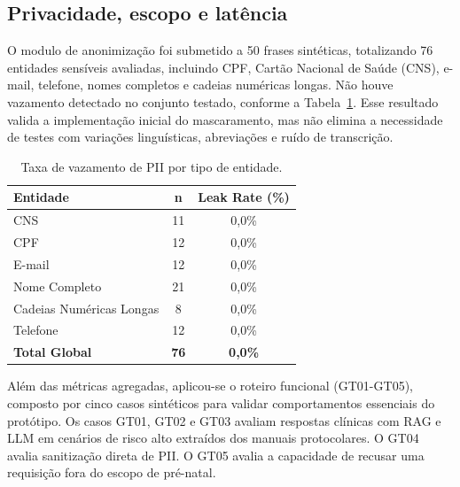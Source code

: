 \documentclass[12pt]{article}
\begin{document}
\subsection{Privacidade, escopo e latência}

O modulo de anonimização foi submetido a 50 frases sintéticas, totalizando 76 entidades sensíveis avaliadas, incluindo CPF, Cartão Nacional de Saúde (CNS), e-mail, telefone, nomes completos e cadeias numéricas longas.
Não houve vazamento detectado no conjunto testado, conforme a Tabela~\ref{tab:pii_leak}. Esse resultado valida a implementação inicial do mascaramento, mas não elimina a necessidade de testes com variações linguísticas, abreviações e ruído de transcrição.

\begin{table}[H]
  \centering
  \caption{Taxa de vazamento de PII por tipo de entidade.}
  \label{tab:pii_leak}
  \small
  \begin{tabular}{lcc}
  	\toprule
	\textbf{Entidade} 	 	   & \textbf{n} 		  & \textbf{Leak Rate (\%)} \\
	\midrule
  	CNS     			   & 11                           & 0,0\%                   \\
  	CPF                                & 12                           & 0,0\%                   \\
  	E-mail                             & 12                           & 0,0\%                   \\
  	Nome Completo			   & 21                           & 0,0\%                   \\
  	Cadeias Numéricas Longas           & 8                            & 0,0\%                   \\
  	Telefone                           & 12                           & 0,0\%                   \\
	\midrule
  	\textbf{Total Global}              & \textbf{76}                  & \textbf{0,0\%}          \\
  	\bottomrule
  \end{tabular}
  \end{table}
 
Além das métricas agregadas, aplicou-se o roteiro funcional (GT01-GT05), composto por cinco casos sintéticos para validar comportamentos essenciais do protótipo.
Os casos GT01, GT02 e GT03 avaliam respostas clínicas com RAG e LLM em cenários de risco alto extraídos dos manuais protocolares.
O GT04 avalia sanitização direta de PII.
O GT05 avalia a capacidade de recusar uma requisição fora do escopo de pré-natal.
\end{document}

